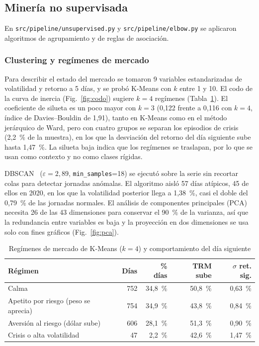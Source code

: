 \documentclass[conference]{IEEEtran}
\begin{document}
\subsection{Minería no supervisada}
En \texttt{src/pipeline/unsupervised.py} y \texttt{src/pipeline/elbow.py} se aplicaron algoritmos de agrupamiento y de reglas de asociación.

\subsubsection{Clustering y regímenes de mercado}
Para describir el estado del mercado se tomaron 9 variables estandarizadas de volatilidad y retorno a 5 días, y se probó K-Means con $k$ entre 1 y 10. El codo de la curva de inercia (Fig.~\ref{fig:codo}) sugiere $k=4$ regímenes (Tabla~\ref{tab:regimes}). El coeficiente de silueta es un poco mayor con $k=3$ (0,122 frente a 0,116 con $k=4$, índice de Davies--Bouldin de 1,91), tanto en K-Means como en el método jerárquico de Ward, pero con cuatro grupos se separan los episodios de crisis (2,2~\% de la muestra), en los que la desviación del retorno del día siguiente sube hasta 1,47~\%. La silueta baja indica que los regímenes se traslapan, por lo que se usan como contexto y no como clases rígidas.

DBSCAN~\cite{ester1996} ($\varepsilon=2{,}89$, \texttt{min\_samples}=18) se ejecutó sobre la serie sin recortar colas para detectar jornadas anómalas. El algoritmo aisló 57 días atípicos, 45 de ellos en 2020, en los que la volatilidad posterior llega a 1,38~\%, casi el doble del 0,79~\% de las jornadas normales. El análisis de componentes principales (PCA) necesita 26 de las 43 dimensiones para conservar el 90~\% de la varianza, así que la redundancia entre variables es baja y la proyección en dos dimensiones se usa solo con fines gráficos (Fig.~\ref{fig:pca}).

\begin{table}[t]
\caption{Regímenes de mercado de K-Means ($k=4$) y comportamiento del día siguiente}
\label{tab:regimes}
\centering
\footnotesize
\begin{tabular}{@{}p{2.9cm}rrrr@{}}
\toprule
Régimen & Días & \% días & TRM sube & $\sigma$ ret. sig. \\
\midrule
Calma & 752 & 34,8~\% & 50,8~\% & 0,63~\% \\
Apetito por riesgo (peso se aprecia) & 754 & 34,9~\% & 43,8~\% & 0,84~\% \\
Aversión al riesgo (dólar sube) & 606 & 28,1~\% & 51,3~\% & 0,90~\% \\
Crisis o alta volatilidad & 47 & 2,2~\% & 42,6~\% & 1,47~\% \\
\bottomrule
\end{tabular}
\end{table}
\end{document}
